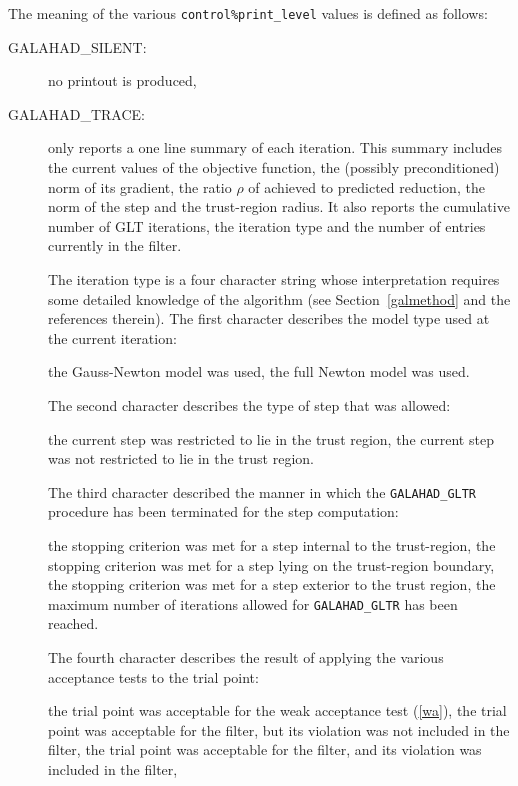 \documentclass{galahad}
\newcommand{\sym}{\sf\small}
\begin{document}
\galinfo
The meaning of the various {\tt control\%print\_level} values is defined as
follows:
\begin{description}
\item[\sym GALAHAD\_SILENT:] no printout is produced,
\item[\sym GALAHAD\_TRACE:] only reports a one line summary of each iteration.
     This summary includes the current values of the objective function,
the (possibly preconditioned) norm of its gradient, the ratio $\rho$ of
achieved to predicted reduction, the norm of the step and the trust-region
radius. It also reports the cumulative number of GLT iterations, the iteration
type and the number of entries currently in the filter.  

\noindent
The iteration type is a four character string whose interpretation requires
some detailed knowledge of the algorithm (see Section~\ref{galmethod} and the
references therein). 
The first character describes the model type used at the current
iteration:
\begin{description}
 the Gauss-Newton model was used, 
 the full Newton model was used.
\end{description}
The second character describes the type of step that was allowed:
\begin{description}
 the current step was restricted to lie in the trust region,
 the current step was not restricted to lie in the trust region.
\end{description}
The third character described the manner in which the {\tt GALAHAD\_GLTR}
procedure has been terminated for the step computation:
\begin{description}
 the stopping criterion was met for a step internal to the
trust-region,
 the stopping criterion was met for a step lying on the trust-region
boundary,
 the stopping criterion was met for a step exterior to the trust
region,
 the maximum number of iterations allowed for {\tt GALAHAD\_GLTR} has
been reached. 
\end{description}
The fourth character describes the result of applying the various acceptance
tests to the trial point:
\begin{description}
 the trial point was acceptable for the weak acceptance test
(\ref{wa}),
 the trial point was acceptable for the filter, but its violation
was not included in the filter,
 the trial point was acceptable for the filter, and its violation
was included in the filter,

\end{description}
\end{description}
\end{document}
